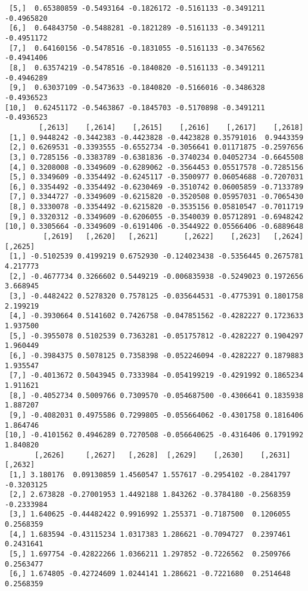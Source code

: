 \documentclass[
  letterpaper,
  DIV=11,
  numbers=noendperiod]{scrreprt}
\begin{document}
\begin{verbatim}
 [5,]  0.65380859 -0.5493164 -0.1826172 -0.5161133 -0.3491211 -0.4965820
 [6,]  0.64843750 -0.5488281 -0.1821289 -0.5161133 -0.3491211 -0.4951172
 [7,]  0.64160156 -0.5478516 -0.1831055 -0.5161133 -0.3476562 -0.4941406
 [8,]  0.63574219 -0.5478516 -0.1840820 -0.5161133 -0.3491211 -0.4946289
 [9,]  0.63037109 -0.5473633 -0.1840820 -0.5166016 -0.3486328 -0.4936523
[10,]  0.62451172 -0.5463867 -0.1845703 -0.5170898 -0.3491211 -0.4936523
        [,2613]    [,2614]    [,2615]    [,2616]    [,2617]    [,2618]
 [1,] 0.9448242 -0.3442383 -0.4423828 -0.4423828 0.35791016  0.9443359
 [2,] 0.6269531 -0.3393555 -0.6552734 -0.3056641 0.01171875 -0.2597656
 [3,] 0.7285156 -0.3383789 -0.6381836 -0.3740234 0.04052734 -0.6645508
 [4,] 0.3208008 -0.3349609 -0.6289062 -0.3564453 0.05517578 -0.7285156
 [5,] 0.3349609 -0.3354492 -0.6245117 -0.3500977 0.06054688 -0.7207031
 [6,] 0.3354492 -0.3354492 -0.6230469 -0.3510742 0.06005859 -0.7133789
 [7,] 0.3344727 -0.3349609 -0.6215820 -0.3520508 0.05957031 -0.7065430
 [8,] 0.3330078 -0.3354492 -0.6215820 -0.3535156 0.05810547 -0.7011719
 [9,] 0.3320312 -0.3349609 -0.6206055 -0.3540039 0.05712891 -0.6948242
[10,] 0.3305664 -0.3349609 -0.6191406 -0.3544922 0.05566406 -0.6889648
         [,2619]   [,2620]   [,2621]      [,2622]    [,2623]   [,2624]  [,2625]
 [1,] -0.5102539 0.4199219 0.6752930 -0.124023438 -0.5356445 0.2675781 4.217773
 [2,] -0.4677734 0.3266602 0.5449219 -0.006835938 -0.5249023 0.1972656 3.668945
 [3,] -0.4482422 0.5278320 0.7578125 -0.035644531 -0.4775391 0.1801758 2.199219
 [4,] -0.3930664 0.5141602 0.7426758 -0.047851562 -0.4282227 0.1723633 1.937500
 [5,] -0.3955078 0.5102539 0.7363281 -0.051757812 -0.4282227 0.1904297 1.960449
 [6,] -0.3984375 0.5078125 0.7358398 -0.052246094 -0.4282227 0.1879883 1.935547
 [7,] -0.4013672 0.5043945 0.7333984 -0.054199219 -0.4291992 0.1865234 1.911621
 [8,] -0.4052734 0.5009766 0.7309570 -0.054687500 -0.4306641 0.1835938 1.887207
 [9,] -0.4082031 0.4975586 0.7299805 -0.055664062 -0.4301758 0.1816406 1.864746
[10,] -0.4101562 0.4946289 0.7270508 -0.056640625 -0.4316406 0.1791992 1.840820
       [,2626]     [,2627]   [,2628]  [,2629]    [,2630]    [,2631]    [,2632]
 [1,] 3.180176  0.09130859 1.4560547 1.557617 -0.2954102 -0.2841797 -0.3203125
 [2,] 2.673828 -0.27001953 1.4492188 1.843262 -0.3784180 -0.2568359 -0.2333984
 [3,] 1.640625 -0.44482422 0.9916992 1.255371 -0.7187500  0.1206055  0.2568359
 [4,] 1.683594 -0.43115234 1.0317383 1.286621 -0.7094727  0.2397461  0.2431641
 [5,] 1.697754 -0.42822266 1.0366211 1.297852 -0.7226562  0.2509766  0.2563477
 [6,] 1.674805 -0.42724609 1.0244141 1.286621 -0.7221680  0.2514648  0.2568359

\end{verbatim}
\end{document}
